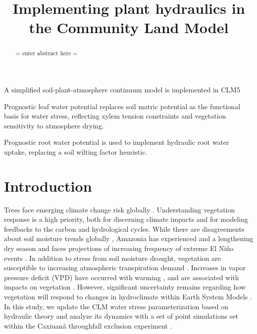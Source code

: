 \documentclass[draft,linenumbers]{agujournal}
\begin{document}
\title{Implementing plant hydraulics in the Community Land Model}



\begin{keypoints}
\item A simplified soil-plant-atmosphere continuum model is implemented in CLM5
\item Prognostic leaf water potential replaces soil matric potential as the functional basis for water stress, reflecting xylem tension constraints and vegetation sensitivity to atmosphere drying. 
\item Prognostic root water potential is used to implement hydraulic root water uptake, replacing a soil wilting factor heuristic.
\end{keypoints}



\begin{abstract}
= enter abstract here =
\end{abstract}


\section{Introduction}

Trees face emerging climate change risk globally \citep{allen2010,anderegg2013b}.
Understanding vegetation response is a high priority, both for discerning climate impacts and for modeling feedbacks to the carbon and hydrological cycles.
While there are disagreements about soil moisture trends globally \citep{dai2013,sheffield2012}, 
Amazonia has experienced and a lengthening dry season \citep{fu2013} and faces projections of increasing frequency of extreme El Ni\~no events \citep{cai2014}.
In addition to stress from soil moisture drought, vegetation are susceptible to increasing atmospheric transpiration demand \citep{restaino2016,novick2016b}.
Increases in vapor pressure deficit (VPD) have occurred with warming \citep{ficklin2017,seager2015}, and are associated with impacts on vegetation \citep{williams2013,mcdowell2015}.
However, significant uncertainty remains regarding how vegetation will respond to changes in hydroclimate within Earth System Models \citep{dekauwe2017,friedlingstein2014}.
In this study, we update the CLM water stress parameterization based on hydraulic theory and
analyze its dynamics with a set of point simulations set within the Caxiuan\~a throughfall exclusion experiment \citep{fisher2006}.
\end{document}
